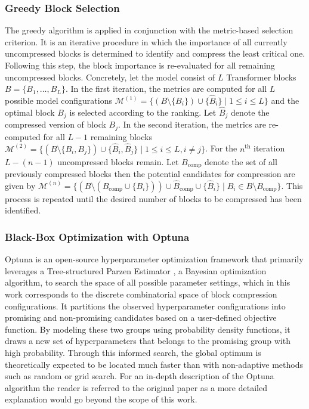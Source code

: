 \subsubsection{Greedy Block Selection}
\label{sec:GreedyBlockSelection}
The greedy algorithm is applied in conjunction with the metric-based selection criterion. It is an iterative procedure in which the importance of all currently uncompressed blocks is determined to identify and compress the least critical one. Following this step, the block importance is re-evaluated for all remaining uncompressed blocks. Concretely, let the model consist of $L$ Transformer blocks $B=\{B_1, \dots, B_L\}$. 
In the first iteration, the metrics are computed for all $L$ possible model configurations $\mathcal{M}^{(1)} = \{ (B \setminus \{B_i\}) \cup \{\hat{B}_i\} \mid 1 \leq i \leq L \}$ and the optimal block $B_j$ is selected according to the ranking. Let $\hat{B}_j$ denote the compressed version of block $B_j$.
 In the second iteration, the metrics are re-computed for all $L-1$ remaining blocks
 $\mathcal{M}^{(2)} = \{ (B \setminus \{B_i, B_j\}) \cup \{\hat{B}_i, \hat{B}_j\} \mid 1 \leq i \leq L, i \neq j \}$.  For the $n^\text{th}$ iteration $L-(n-1)$ uncompressed blocks remain. Let $B_\text{comp}$ denote the set of all previously compressed blocks then the potential candidates for compression are given by  $\mathcal{M}^{(n)} = \{ (B \setminus (B_\text{comp} \cup  \{B_i\})) \cup \hat{B}_\text{comp} \cup \{\hat{B}_i\} \mid B_i \in B \setminus B_\text{comp} \}$.
 This process is repeated until the desired number of blocks to be compressed has been identified.
%  
  
\subsubsection{Black-Box Optimization with Optuna}
\label{sec:Optuna}
Optuna \cite{akiba2019optuna} is an open-source hyperparameter optimization framework that primarily leverages a Tree-structured Parzen Estimator \cite{bergstra2011algorithms}, a Bayesian optimization algorithm, to search the space of all possible parameter settings, which in this work corresponds to the discrete combinatorial space of block compression configurations. It partitions the observed hyperparameter configurations into promising and non-promising candidates based on a user-defined objective function. By modeling these two groups using probability density functions, it draws a new set of hyperparameters that belongs to the promising group  with high probability. Through this informed search, the global optimum is theoretically expected to be located much faster than with non-adaptive methods such as random or grid search. For an in-depth description of the Optuna algorithm the reader is referred to the original paper \cite{akiba2019optuna} as a more detailed explanation would go beyond the scope of this work. 


